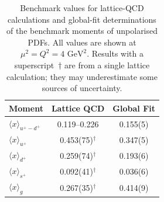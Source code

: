 \begin{table}[!t]
\centering
\renewcommand{\arraystretch}{1.2}
\begin{tabular}{lcc}
\toprule
Moment & Lattice QCD & Global Fit\\
\midrule
$\langle x \rangle_{u^+ -d^+}$ 
& \numrange{0.119}{0.226} 
& 0.155(5)\\
$\langle x \rangle_{u^+}$     
& 0.453(75)$^\dagger$ 
& 0.347(5)\\
$\langle x \rangle_{d^+}$     
& 0.259(74)$^\dagger$ 
& 0.193(6)\\
$\langle x \rangle_{s^+}$     
& 0.092(41)$^\dagger$ 
& 0.036(6)\\
$\langle x\rangle_{g}$       
& 0.267(35)$^\dagger$ 
& 0.414(9)\\
\bottomrule
\end{tabular}
\caption{\small Benchmark values for lattice-QCD calculations and global-fit 
determinations of the benchmark moments of unpolarised PDFs.
%
All values are shown at $\mu^2=Q^2=4\mbox{ GeV}^2$.
%
Results with a superscript~$\dagger$ are from a single lattice 
calculation; they may underestimate some sources of uncertainty.}
\label{tab:BMunp}
\end{table}

